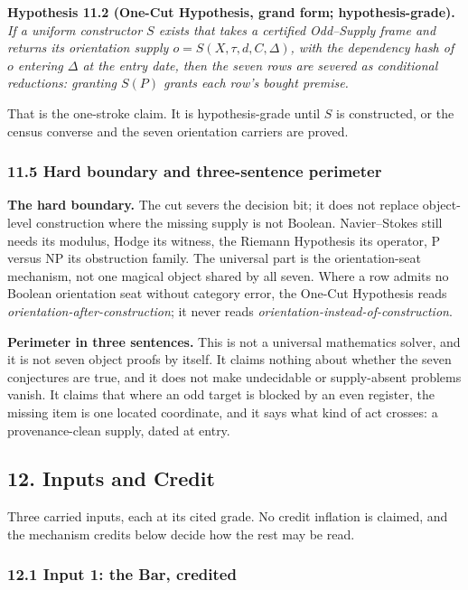 \documentclass[10pt,twocolumn]{article}
\begin{document}
\textbf{Hypothesis 11.2 (One-Cut Hypothesis, grand form;
hypothesis-grade).} \emph{If a uniform constructor \(S\) exists that
takes a certified Odd--Supply frame and returns its orientation supply
\(o = S(X, \tau, d, C, \Delta)\), with the dependency hash of \(o\)
entering \(\Delta\) at the entry date, then the seven rows are severed
as conditional reductions: granting \(S(P)\) grants each row's bought
premise.}

That is the one-stroke claim. It is hypothesis-grade until \(S\) is
constructed, or the census converse and the seven orientation carriers
are proved.

\subsubsection{11.5 Hard boundary and three-sentence
perimeter}\label{hard-boundary-and-three-sentence-perimeter}

\textbf{The hard boundary.} The cut severs the decision bit; it does not
replace object-level construction where the missing supply is not
Boolean. Navier--Stokes still needs its modulus, Hodge its witness, the
Riemann Hypothesis its operator, P versus NP its obstruction family. The
universal part is the orientation-seat mechanism, not one magical object
shared by all seven. Where a row admits no Boolean orientation seat
without category error, the One-Cut Hypothesis reads
\emph{orientation-after-construction}; it never reads
\emph{orientation-instead-of-construction}.

\textbf{Perimeter in three sentences.} This is not a universal
mathematics solver, and it is not seven object proofs by itself. It
claims nothing about whether the seven conjectures are true, and it does
not make undecidable or supply-absent problems vanish. It claims that
where an odd target is blocked by an even register, the missing item is
one located coordinate, and it says what kind of act crosses: a
provenance-clean supply, dated at entry.

\subsection{12. Inputs and Credit}\label{inputs-and-credit}

Three carried inputs, each at its cited grade. No credit inflation is
claimed, and the mechanism credits below decide how the rest may be
read.

\subsubsection{12.1 Input 1: the Bar,
credited}\label{input-1-the-bar-credited}
\end{document}
